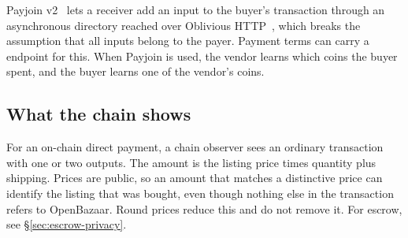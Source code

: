 Payjoin v2~\citep{bip77} lets a receiver add an input to the buyer's transaction through an asynchronous directory reached over Oblivious HTTP~\citep{rfc9458}, which breaks the assumption that all inputs belong to the payer. Payment terms can carry a  endpoint for this. When Payjoin is used, the vendor learns which coins the buyer spent, and the buyer learns one of the vendor's coins.

\subsection{What the chain shows}

For an on-chain direct payment, a chain observer sees an ordinary transaction with one or two outputs. The amount is the listing price times quantity plus shipping. Prices are public, so an amount that matches a distinctive price can identify the listing that was bought, even though nothing else in the transaction refers to OpenBazaar. Round prices reduce this and do not remove it. For escrow, see \S\ref{sec:escrow-privacy}.
